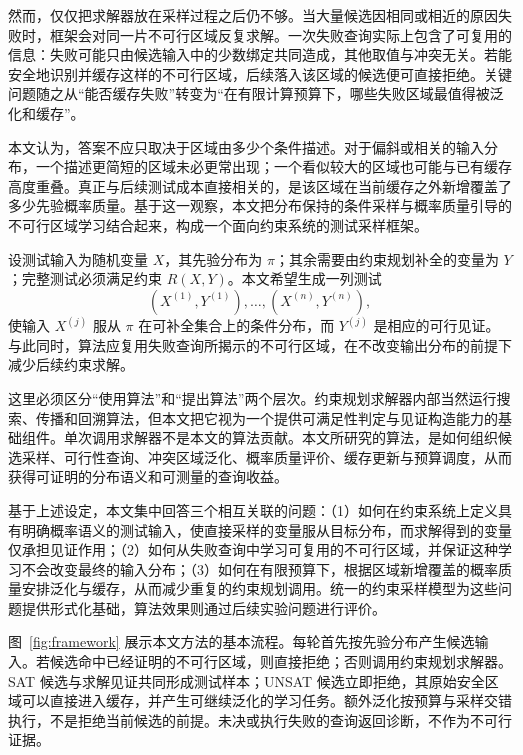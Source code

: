 \documentclass[UTF8, fontset=none, a4paper, 12pt]{ctexart}
\begin{document}
然而，仅仅把求解器放在采样过程之后仍不够。当大量候选因相同或相近的原因失败时，框架会对同一片不可行区域反复求解。一次失败查询实际上包含了可复用的信息：失败可能只由候选输入中的少数绑定共同造成，其他取值与冲突无关。若能安全地识别并缓存这样的不可行区域，后续落入该区域的候选便可直接拒绝。关键问题随之从“能否缓存失败”转变为“在有限计算预算下，哪些失败区域最值得被泛化和缓存”。

本文认为，答案不应只取决于区域由多少个条件描述。对于偏斜或相关的输入分布，一个描述更简短的区域未必更常出现；一个看似较大的区域也可能与已有缓存高度重叠。真正与后续测试成本直接相关的，是该区域在当前缓存之外新增覆盖了多少先验概率质量。基于这一观察，本文把分布保持的条件采样与概率质量引导的不可行区域学习结合起来，构成一个面向约束系统的测试采样框架。

设测试输入为随机变量 $X$，其先验分布为 $\pi$；其余需要由约束规划补全的变量为 $Y$；完整测试必须满足约束 $R(X,Y)$。本文希望生成一列测试
\[
  (X^{(1)},Y^{(1)}),\ldots,(X^{(n)},Y^{(n)}),
\]
使输入 $X^{(j)}$ 服从 $\pi$ 在可补全集合上的条件分布，而 $Y^{(j)}$ 是相应的可行见证。与此同时，算法应复用失败查询所揭示的不可行区域，在不改变输出分布的前提下减少后续约束求解。

这里必须区分“使用算法”和“提出算法”两个层次。约束规划求解器内部当然运行搜索、传播和回溯算法，但本文把它视为一个提供可满足性判定与见证构造能力的基础组件。单次调用求解器不是本文的算法贡献。本文所研究的算法，是如何组织候选采样、可行性查询、冲突区域泛化、概率质量评价、缓存更新与预算调度，从而获得可证明的分布语义和可测量的查询收益。

基于上述设定，本文集中回答三个相互关联的问题：（1）如何在约束系统上定义具有明确概率语义的测试输入，使直接采样的变量服从目标分布，而求解得到的变量仅承担见证作用；（2）如何从失败查询中学习可复用的不可行区域，并保证这种学习不会改变最终的输入分布；（3）如何在有限预算下，根据区域新增覆盖的概率质量安排泛化与缓存，从而减少重复的约束规划调用。统一的约束采样模型为这些问题提供形式化基础，算法效果则通过后续实验问题进行评价。

图~\ref{fig:framework} 展示本文方法的基本流程。每轮首先按先验分布产生候选输入。若候选命中已经证明的不可行区域，则直接拒绝；否则调用约束规划求解器。SAT 候选与求解见证共同形成测试样本；UNSAT 候选立即拒绝，其原始安全区域可以直接进入缓存，并产生可继续泛化的学习任务。额外泛化按预算与采样交错执行，不是拒绝当前候选的前提。未决或执行失败的查询返回诊断，不作为不可行证据。
\end{document}
